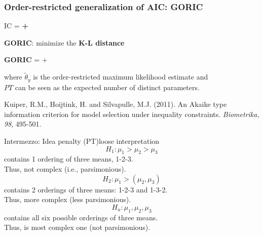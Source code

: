 \documentclass[10pt]{beamer}\usepackage[]{graphicx}\usepackage[]{xcolor}
\begin{document}
%
\begin{frame}
	\frametitle{Order-restricted generalization of AIC: GORIC}
	
	\centerline{	IC = \textbf{{\color{orange}{model misfit}} + {\color{purple}{model complexity}}}}
	\vspace{.5 cm}
	
	{\textbf{GORIC}: minimize the \textbf{K-L distance}}
	
	\vspace{1cm}
	\centerline{{\textbf{GORIC} ={} + \color{purple}{$2 PT$}}}
	
	\vspace{.5 cm}
	where $\tilde{\theta}_y$ is the order-restricted maximum likelihood estimate and\\
	$PT$ can be seen as the expected number of distinct parameters.
	
	\vspace{.5 cm}
	\footnotesize{
	Kuiper, R.M., Hoijtink, H. and Silvapulle, M.J. (2011). An Akaike type information criterion for model selection under inequality constraints. \emph{Biometrika, 98}, 495-501.
	}
	
\end{frame}
%
\begin{frame}{Intermezzo: Idea penalty (PT)}{loose interpretation}
\begin{displaymath}
H_1: \mu_1 > \mu_2 > \mu_3
\end{displaymath}
contains 1 ordering of three means, 1-2-3. \\
Thus, not complex (i.e., parsimonious).
\begin{displaymath}
H_2: \mu_1 > (\mu_2, \mu_3)
\end{displaymath}
contains 2 orderings of three means: 1-2-3 and 1-3-2. \\
Thus, more complex (less parsimonious).
\begin{displaymath}
H_u: \mu_1 , \mu_2 , \mu_3
\end{displaymath}
contains all six possible orderings of three means. \\
Thus, is most complex one (not parsimonious).
\end{frame}
%
\end{document}
